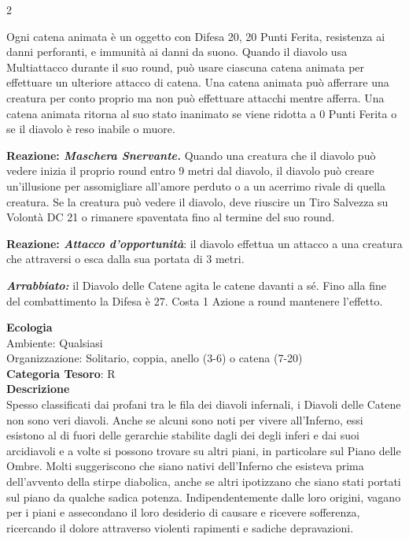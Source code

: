 \begin{multicols}{2}
{Ogni catena animata è un oggetto con Difesa 20, 20 Punti Ferita, resistenza ai danni perforanti, e immunità ai danni da suono. Quando il diavolo usa Multiattacco durante il suo round, può usare ciascuna catena animata per effettuare un ulteriore attacco di catena. Una catena animata può afferrare una creatura per conto proprio ma non può effettuare attacchi mentre afferra. Una catena animata ritorna al suo stato inanimato se viene ridotta a 0 Punti Ferita o se il diavolo è reso inabile o muore.

\textbf{Reazione: \emph{Maschera Snervante.}} Quando una creatura che il diavolo può vedere inizia il proprio round entro 9 metri dal diavolo, il diavolo può creare un'illusione per assomigliare all'amore perduto o a un acerrimo rivale di quella creatura. Se la creatura può vedere il diavolo, deve riuscire un Tiro Salvezza su Volontà DC 21 o rimanere spaventata fino al termine del suo round.

\textbf{Reazione: \emph{Attacco d'opportunità}}: il diavolo effettua un attacco a una creatura che attraversi o esca dalla sua portata di 3 metri.

\emph{\textbf{Arrabbiato:}} il Diavolo delle Catene agita le catene davanti a sé. Fino alla fine del combattimento la Difesa è 27. Costa 1 Azione a round mantenere l'effetto.

\textbf{Ecologia}\\
Ambiente: Qualsiasi\\
Organizzazione: Solitario, coppia, anello (3-6) o catena (7-20)\\
\textbf{Categoria Tesoro}: R\\
\textbf{Descrizione}\\
Spesso classificati dai profani tra le fila dei diavoli infernali, i Diavoli delle Catene non sono veri diavoli. Anche se alcuni sono noti per vivere all'Inferno, essi esistono al di fuori delle gerarchie stabilite dagli dei degli inferi e dai suoi arcidiavoli e a volte si possono trovare su altri piani, in particolare sul Piano delle Ombre. Molti suggeriscono che siano nativi dell'Inferno che esisteva prima dell'avvento della stirpe diabolica, anche se altri ipotizzano che siano stati portati sul piano da qualche sadica potenza. Indipendentemente dalle loro origini, vagano per i piani e assecondano il loro desiderio di causare e ricevere sofferenza, ricercando il dolore attraverso violenti rapimenti e sadiche depravazioni.

}
\end{multicols}
